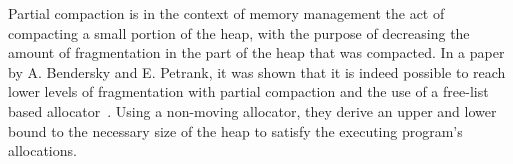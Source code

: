 

Partial compaction is in the context of memory management the act of compacting a small portion of the heap, with the purpose of decreasing the amount of fragmentation in the part of the heap that was compacted. In a paper by A. Bendersky and E. Petrank, it was shown that it is indeed possible to reach lower levels of fragmentation with partial compaction and the use of a free-list based allocator~\cite{partial-compaction}. Using a non-moving allocator, they derive an upper and lower bound to the necessary size of the heap to satisfy the executing program's allocations.